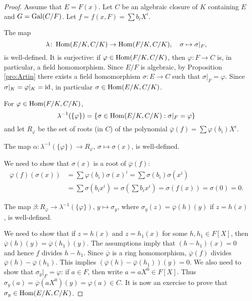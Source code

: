  \begin{proof}
    Assume that $E=F(x)$. 
    Let $C$ be an algebraic closure of $K$ containing $E$ 
    and $G=\operatorname{Gal}(C/F)$. Let $f=f(x,F)=\sum b_iX^i$.
    
    The map
    \[
    \lambda\colon \operatorname{Hom}(E/K,C/K)\to\operatorname{Hom}(F/K,C/K),\quad
    \sigma\mapsto\sigma|_F,
    \]
    is well-defined. 
    It is surjective: 
    if $\varphi\in\operatorname{Hom}(F/K,C/K)$, then $\varphi\colon F\to C$ is, 
    in particular, a field homomorphism. Since $E/F$ is algebraic, by Proposition \ref{pro:Artin} 
    there exists a field homomorphism 
    $\sigma\colon E\to C$ such that $\sigma|_F=\varphi$. Since $\sigma|_K=\varphi|_K=\operatorname{id}$, in particular 
    $\sigma\in\operatorname{Hom}(E/K,C/K)$. 
    
    For $\varphi\in\operatorname{Hom}(F/K,C/K)$,  
    \[
    \lambda^{-1}(\{\varphi\})=\{\sigma\in\operatorname{Hom}(E/K,C/K):\sigma|_F=\varphi\}
    \]
    and let $R_\varphi$ be the set of roots (in $C$) of the polynomial $\overline{\varphi}(f)=\sum\varphi(b_i)X^i$. 
    
    \begin{claim}
        The map $\alpha\colon \lambda^{-1}(\{\varphi\})\to R_{\varphi}$, $\sigma\mapsto\sigma(x)$, is well-defined. 
    \end{claim}
    
    We need to show that $\sigma(x)$ is a root of $\overline{\varphi}(f)$:
    \begin{align*}
    \overline{\varphi}(f)(\sigma(x))&=\sum \varphi(b_i)\sigma(x)^i
    =\sum\sigma(b_i)\sigma(x^i)\\
    &=\sum\sigma(b_ix^i)=\sigma\left(\sum b_ix^i\right)=\sigma(f(x))=\sigma(0)=0.
    \end{align*}
    
    \begin{claim}
    The map $\beta\colon R_{\varphi}\to \lambda^{-1}(\{\varphi\})$, $y\mapsto\sigma_y$, 
    where $\sigma_y(z)=\overline{\varphi}(h)(y)$
    if $z=h(x)$, is well-defined. 
    \end{claim}
    
    We need to show that if $z=h(x)$ and 
    $z=h_1(x)$ for some $h,h_1\in F[X]$, then 
    $\overline{\varphi}(h)(y)=\overline{\varphi}(h_1)(y)$. 
    The assumptions imply that 
    $(h-h_1)(x)=0$ and hence $f$ divides $h-h_1$. Since
    $\overline{\varphi}$ is a ring homomorphism, 
    $\overline{\varphi}(f)$ divides $\overline{\varphi}(h)-\overline{\varphi}(h_1)$. 
    This implies $(\overline{\varphi}(h)-\overline{\varphi}(h_1))(y)=0$. We also need to show that 
    $\sigma_y|_F=\varphi$: if $a\in F$, then 
    write $a=aX^0\in F[X]$. Thus 
    $\sigma_y(a)=\overline{\varphi}(aX^0)(y)=\varphi(a)\in C$. 
    It is now an exercise to prove that $\sigma_y\in\operatorname{Hom}(E/K,C/K)$. 
    

\end{proof}
